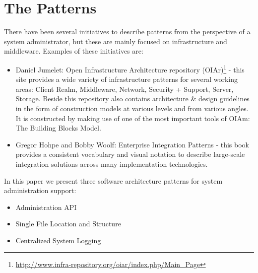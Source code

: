\section{The Patterns}


There have been several initiatives to describe patterns from the perspective of a system administrator, but these are mainly focused on infrastructure and middleware. Examples of these initiatives are: 
\begin{itemize}
	\item Daniel Jumelet: Open Infrastructure Architecture repository (OIAr)\footnote{\url{http://www.infra-repository.org/oiar/index.php/Main_Page}} - this site provides a wide variety of infrastructure patterns for several working areas: Client Realm, Middleware, Network, Security + Support, Server, Storage. Beside this repository also contains architecture \& design guidelines in the form of construction models at various levels and from various angles. It is constructed by making use of one of the most important tools of OIAm: The Building Blocks Model. 
	\item Gregor Hohpe and Bobby Woolf: Enterprise Integration Patterns\cite{Hohpe2003} - this book provides a consistent vocabulary and visual notation to describe large-scale integration solutions across many implementation technologies. 
\end{itemize}

In this paper we present three software architecture patterns for system administration support: 
\begin{itemize} 
	\item {\sc Administration API}
	\item {\sc Single File Location and Structure}
	\item {\sc Centralized System Logging}
\end{itemize}


